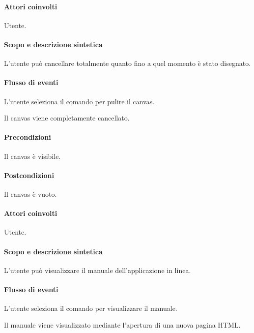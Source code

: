 
\paragraph{Attori coinvolti} Utente.
\paragraph{Scopo e descrizione sintetica}
L'utente pu\`o cancellare totalmente quanto fino a quel momento \`e stato disegnato.
\paragraph{Flusso di eventi}
\begin{elenconumerato}[\textbf{}]{\subsubsecindent}
\item L'utente seleziona il comando per pulire il canvas. 
\item Il canvas viene completamente cancellato.
\end{elenconumerato}
\paragraph{Precondizioni} Il canvas \`e visibile.
\paragraph{Postcondizioni} Il canvas \`e vuoto.

\paragraph{Attori coinvolti} Utente.
\paragraph{Scopo e descrizione sintetica}
L'utente pu\`o visualizzare il manuale dell'applicazione in linea.
\paragraph{Flusso di eventi}
\begin{elenconumerato}[\textbf{}]{\subsubsecindent}
\item L'utente seleziona il comando per visualizzare il manuale. 
\item Il manuale viene visualizzato mediante l'apertura di una nuova pagina HTML.
\end{elenconumerato}
